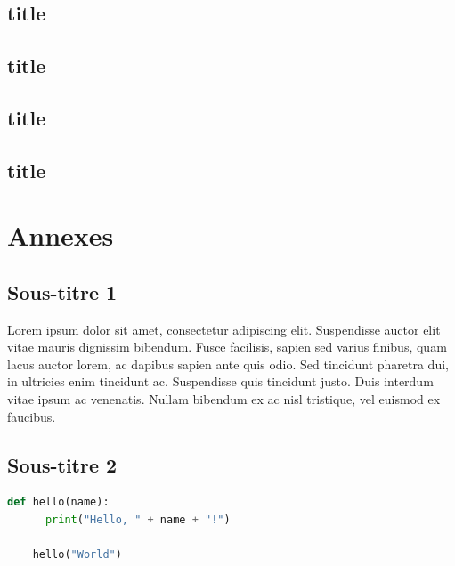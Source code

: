 \documentclass[12pt, a4paper, oneside]{Thesis}
\begin{document}
\newpage

\subsection{title}

\subsection{title}

\subsection{title}

\subsection{title}

\newpage

\section{Annexes}

\subsection{Sous-titre 1}


Lorem ipsum dolor sit amet, consectetur adipiscing elit. Suspendisse auctor elit vitae mauris dignissim bibendum. Fusce facilisis, sapien sed varius finibus, quam lacus auctor lorem, ac dapibus sapien ante quis odio. Sed tincidunt pharetra dui, in ultricies enim tincidunt ac. Suspendisse quis tincidunt justo. Duis interdum vitae ipsum ac venenatis. Nullam bibendum ex ac nisl tristique, vel euismod ex faucibus.\\

\subsection{Sous-titre 2}

\begin{lstlisting}[language=Python, caption={Exemple de code Python}, label=mon-code-python]
	def hello(name):
	  print("Hello, " + name + "!")
	
	hello("World")
\end{lstlisting}
\end{document}
